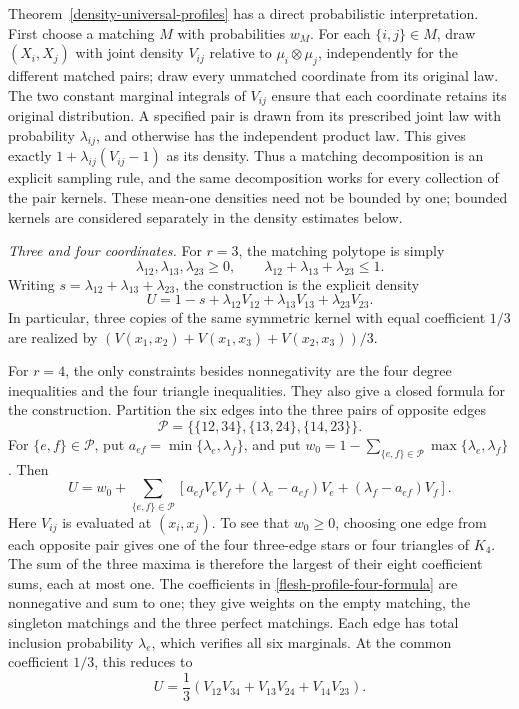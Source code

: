 \documentclass[a4paper,11pt,reqno]{amsart}
\newcommand{\proofpart}[1]{%
  \par\smallskip\noindent\textit{#1.}\enspace\ignorespaces}
\theoremstyle{plain}
\theoremstyle{definition}
\theoremstyle{remark}
\begin{document}
Theorem~\ref{density-universal-profiles} has a direct probabilistic
interpretation.  First choose a matching $M$ with probabilities $w_M$.
For each $\{i,j\}\in M$, draw $(X_i,X_j)$ with joint density $V_{ij}$
relative to $\mu_i\otimes\mu_j$, independently for the different
matched pairs; draw every unmatched coordinate from its original law.
The two constant marginal integrals of $V_{ij}$ ensure that each
coordinate retains its original distribution.  A specified pair is
drawn from its prescribed joint law with probability $\lambda_{ij}$,
and otherwise has the independent product law.  This gives exactly
$1+\lambda_{ij}(V_{ij}-1)$ as its density.  Thus a matching
decomposition is an explicit sampling rule, and the same decomposition
works for every collection of the pair kernels.  These mean-one
densities need not be bounded by one; bounded kernels are considered
separately in the density estimates below.

\proofpart{Three and four coordinates}
For $r=3$, the matching polytope is simply
\[
 \lambda_{12},\lambda_{13},\lambda_{23}\ge0,
 \qquad \lambda_{12}+\lambda_{13}+\lambda_{23}\le1.
\]
Writing $s=\lambda_{12}+\lambda_{13}+\lambda_{23}$, the construction
is the explicit density
\[
 U=1-s+\lambda_{12}V_{12}+\lambda_{13}V_{13}
           +\lambda_{23}V_{23}.
\]
In particular, three copies of the same symmetric kernel with equal
coefficient $1/3$ are realized by
$(V(x_1,x_2)+V(x_1,x_3)+V(x_2,x_3))/3$.

For $r=4$, the only constraints besides nonnegativity are the four
degree inequalities and the four triangle inequalities.  They also
give a closed formula for the construction.  Partition the six edges
into the three pairs of opposite edges
\[
 \mathcal P=\{\{12,34\},\{13,24\},\{14,23\}\}.
\]
For $\{e,f\}\in\mathcal P$, put
$a_{ef}=\min\{\lambda_e,\lambda_f\}$, and put
$w_0=1-\sum_{\{e,f\}\in\mathcal P}
                \max\{\lambda_e,\lambda_f\}$.
Then
\begin{equation}\label{flesh-profile-four-formula}
 U=w_0+\sum_{\{e,f\}\in\mathcal P}
 \left[a_{ef}V_eV_f+
       (\lambda_e-a_{ef})V_e+(
       \lambda_f-a_{ef})V_f\right].
\end{equation}
Here $V_{ij}$ is evaluated at $(x_i,x_j)$.
To see that $w_0\ge0$, choosing one edge from each opposite pair
gives one of the four three-edge stars or four triangles of $K_4$.
The sum of the three maxima is therefore the largest of their eight
coefficient sums, each at most one.  The coefficients in
\eqref{flesh-profile-four-formula} are nonnegative and sum to one;
they give weights on the empty matching, the singleton matchings
and the three perfect matchings.  Each edge has total inclusion
probability $\lambda_e$, which verifies all six marginals.
At the common coefficient $1/3$, this reduces to
\[
 U=\frac13\left(V_{12}V_{34}+V_{13}V_{24}+V_{14}V_{23}\right).
\]
\end{document}
